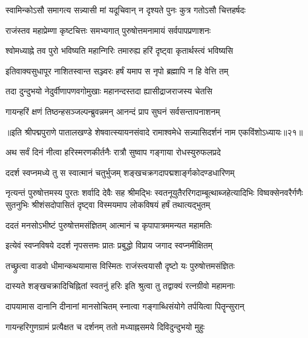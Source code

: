 \twolineshloka
{स्वामिन्कोऽसौ समागत्य सन्न्यासी मां यदूचिवान्}
{न दृश्यते पुनः कुत्र गतोऽसौ चित्तहर्षदः}%


\twolineshloka
{राजंस्तव महाप्रेम्णा कृष्टचित्तः समभ्यगात्}
{पुरुषोत्तमनामायं सर्वपापप्रणाशनः}%

\twolineshloka
{श्वोमध्याह्ने तव पुरो भविष्यति महान्गिरिः}
{तमारुह्य हरिं दृष्ट्वा कृतार्थस्त्वं भविष्यसि}%

\twolineshloka
{इतिवाक्यसुधापूर नाशितस्वान्त सञ्ज्वरः}
{हर्षं यमाप स नृपो ब्रह्मापि न हि वेत्ति तम्}%

\twolineshloka
{तदा दुन्दुभयो नेदुर्वीणापणवगोमुखाः}
{महानन्दस्तदा ह्यासीद्राजराजस्य चेतसि}%

\twolineshloka
{गायन्हरिं क्षणं तिष्ठन्हसञ्जल्पन्ब्रुवन्नमन्}
{आनन्दं प्राप सुघनं सर्वसन्तापनाशनम्}%

{॥इति श्रीपद्मपुराणे पातालखण्डे शेषवात्स्यायनसंवादे रामाश्वमेधे सन्न्यासिदर्शनं नाम एकविंशोऽध्यायः॥२१॥}



\twolineshloka
{अथ सर्वं दिनं नीत्वा हरिस्मरणकीर्तनैः}
{रात्रौ सुष्वाप गङ्गाया रोधस्युरुफलप्रदे}%

\twolineshloka
{ददर्श स्वप्नमध्ये तु स स्वात्मानं चतुर्भुजम्}
{शङ्खचक्रगदापद्मशार्ङ्गकोदण्डधारिणम्}%

\fourlineindentedshloka
{नृत्यन्तं पुरुषोत्तमस्य पुरतः शर्वादि देवैः सह}
{श्रीमद्भिः स्वतनूयुतैररिगदाम्बूत्थाब्जहेत्यादिभिः}
{विष्वक्सेनवरैर्गणैः सुतनुभिः श्रीशंसदोपासितं}
{दृष्ट्वा विस्मयमाप लोकविषयं हर्षं तथात्यद्भुतम्}%

\twolineshloka
{ददतं मनसोऽभीष्टं पुरुषोत्तमसंज्ञितम्}
{आत्मानं च कृपापात्रममन्यत महामतिः}%

\twolineshloka
{इत्येवं स्वप्नविषये ददर्श नृपसत्तमः}
{प्रातः प्रबुद्धो विप्राय जगाद स्वप्नमीक्षितम्}%

\twolineshloka
{तच्छ्रुत्वा वाडवो धीमान्कथयामास विस्मितः}
{राजंस्त्वयासौ दृष्टो यः पुरुषोत्तमसंज्ञितः}%

\twolineshloka
{दास्यते शङ्खचक्रादिचिह्नितां स्वतनुं हरिः}
{इति श्रुत्वा तु तद्वाक्यं रत्नग्रीवो महामनाः}%

\twolineshloka
{दापयामास दानानि दीनानां मानसोचितम्}
{स्नात्वा गङ्गाब्धिसंयोगे तर्पयित्वा पितॄन्सुरान्}%

\twolineshloka
{गायन्हरिगुणग्रामं प्रत्यैक्षत च दर्शनम्}
{ततो मध्याह्नसमये दिविदुन्दुभयो मुहुः}%

